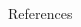 \begin{frame}
\begin{columns}[t]
\begin{column}{.98\textwidth}
\begin{block}{References}
			\end{block}
		\end{column}

		\begin{column}{.01\textwidth}\end{column}
	\end{columns}

\end{frame} %
